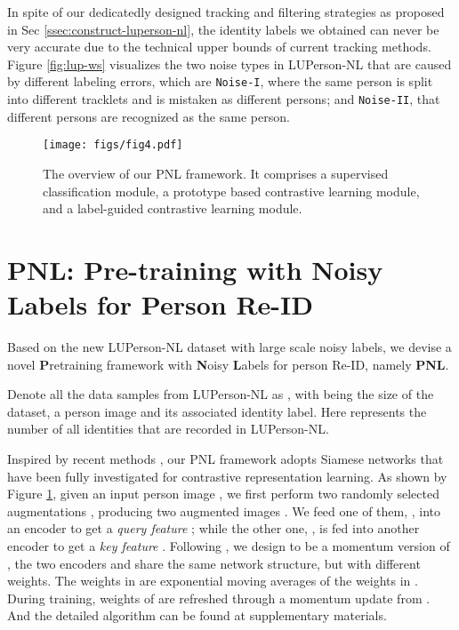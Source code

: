 \documentclass[10pt,twocolumn,letterpaper]{article}
\begin{document}
In spite of our dedicatedly designed tracking and filtering strategies as proposed in Sec \ref{ssec:construct-luperson-nl}, 
the identity labels we obtained can never be very accurate due to the technical upper bounds of current tracking methods.
Figure \ref{fig:lup-ws} visualizes the two noise types in LUPerson-NL that are caused by different labeling errors, which are
\texttt{Noise-I}, where the same person is split into different tracklets and is mistaken as different persons;
and \texttt{Noise-II}, that different persons are recognized as the same person.

\begin{figure}[t]
\begin{center}
    \texttt{[image: figs/fig4.pdf]}
\end{center}
\caption{The overview of our PNL framework. It comprises a supervised classification module, a prototype based contrastive learning module, and a label-guided contrastive learning module.}
\label{fig:wsp}
\end{figure}

\section{PNL: Pre-training with Noisy Labels for Person Re-ID}
Based on the new LUPerson-NL dataset with large scale noisy labels, we devise a novel \textbf{P}retraining  framework with \textbf{N}oisy \textbf{L}abels for person Re-ID, namely \textbf{PNL}. 

Denote all the data samples from LUPerson-NL as , 
with  being the size of the dataset,  a person image and  its associated identity label.
Here  represents the number of all identities that are recorded in LUPerson-NL.

Inspired by recent methods \cite{he2020momentum,chen2020mocov2,chen2020simple,chen2020big,grill2020bootstrap,li2020mopro}, our PNL framework adopts Siamese networks that have been fully investigated for contrastive representation learning. As shown by Figure \ref{fig:wsp},
given an input person image , we first perform two randomly selected augmentations , producing two augmented images .
We feed one of them, , into an encoder  to get a \emph{query feature} ; while the other one, , is fed into another encoder  to get a \emph{key feature} . Following \cite{he2020momentum}, we design  to be a momentum version of , \ie the two encoders  and  share the same network structure, but with different weights. The weights in  are {exponential moving averages} of the weights in . During training, weights of  are refreshed through a momentum update from . And the detailed algorithm can be found at supplementary materials.
\end{document}
